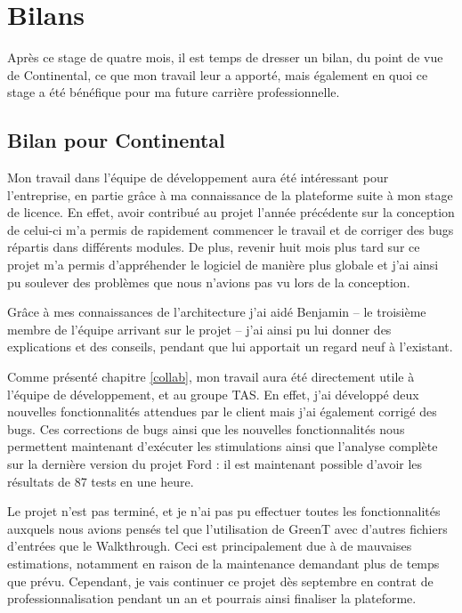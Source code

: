 \chapter{Bilans}
\putminitoc

Après ce stage de quatre mois, il est temps de dresser un bilan, du point de vue de Continental, ce que mon travail leur a apporté, mais également en quoi ce stage a été bénéfique pour ma future carrière professionnelle.

\section{Bilan pour Continental}
Mon travail dans l'équipe de développement aura été intéressant pour l'entreprise, en partie grâce à ma connaissance de la plateforme suite à mon stage de licence. En effet, avoir contribué au projet l'année précédente sur la conception de celui-ci m'a permis de rapidement commencer le travail et de corriger des bugs répartis dans différents modules. De plus, revenir huit mois plus tard sur ce projet m'a permis d'appréhender le logiciel de manière plus globale et j'ai ainsi pu soulever des problèmes que nous n'avions pas vu lors de la conception.

Grâce à mes connaissances de l'architecture j'ai aidé Benjamin  -- le troisième membre de l'équipe arrivant sur le projet -- j'ai ainsi pu lui donner des explications et des conseils, pendant que lui apportait un regard neuf à l'existant.

Comme présenté chapitre \ref{collab}, mon travail aura été directement utile à l'équipe de développement, et au groupe TAS. En effet, j'ai développé deux nouvelles fonctionnalités attendues par le client mais j'ai également corrigé des bugs. Ces corrections de bugs ainsi que les nouvelles fonctionnalités nous permettent maintenant d'exécuter les stimulations ainsi que l'analyse complète sur la dernière version du projet Ford : il est maintenant possible d'avoir les résultats de 87 tests en une heure.

Le projet n'est pas terminé, et je n'ai pas pu effectuer toutes les fonctionnalités auxquels nous avions pensés tel que l'utilisation de GreenT avec d'autres fichiers d'entrées que le Walkthrough. Ceci est principalement due à de mauvaises estimations, notamment en raison de la maintenance demandant plus de temps que prévu. Cependant, je vais continuer ce projet dès septembre en contrat de professionnalisation pendant un an et pourrais ainsi finaliser la plateforme.

